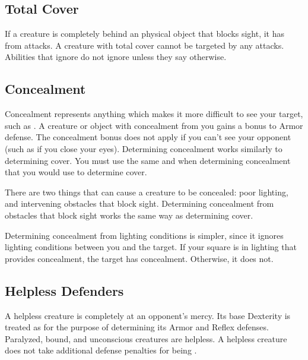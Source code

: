     \subsection{Total Cover}\label{Total Cover}
        If a creature is completely behind an physical object that blocks sight, it has  from attacks.
        A creature with total cover cannot be targeted by any attacks.
        Abilities that ignore  do not ignore  unless they say otherwise.

    \subsection{Concealment}\label{Concealment}
        Concealment represents anything which makes it more difficult to see your target, such as .
        A creature or object with concealment from you gains a  bonus to Armor defense.
        The concealment bonus does not apply if you can't see your opponent (such as if you close your eyes).
        Determining concealment works similarly to determining cover.
        You must use the same  and  when determining concealment that you would use to determine cover.

         There are two things that can cause a creature to be concealed: poor lighting, and intervening obstacles that block sight.
        Determining concealment from obstacles that block sight works the same way as determining cover.

        Determining concealment from lighting conditions is simpler, since it ignores lighting conditions between you and the target.
        If your  square is in lighting that provides concealment, the target has concealment.
        Otherwise, it does not.

    \subsection{Helpless Defenders}
        A helpless creature is completely at an opponent's mercy.
        Its base Dexterity is treated as  for the purpose of determining its Armor and Reflex defenses.
        Paralyzed, bound, and unconscious creatures are helpless.
        A helpless creature does not take additional defense penalties for being .

